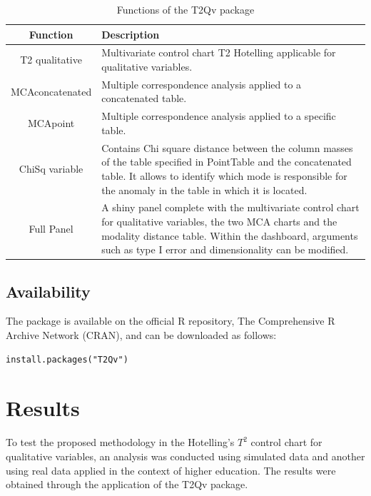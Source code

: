 \documentclass[mathematics,article,submit,moreauthors,pdftex]{mdpi}
\begin{document}
\begin{table}[h!]
\begin{center}
 \begin{tabular}{||c  m{35em}||} 
 \hline
  Function & Description \\ [0.5ex] 
 \hline\hline
 T2 qualitative & Multivariate control chart T2 Hotelling applicable for qualitative variables.\\
 \hline
  MCAconcatenated & Multiple correspondence analysis applied to a concatenated table.\\
\hline
  MCApoint & Multiple correspondence analysis applied to a specific table.\\
\hline
  ChiSq variable & Contains Chi square distance between the column masses of the table specified in PointTable and the concatenated table. It allows to identify which mode is responsible for the anomaly in the table in which it is located. \\ [1ex] 
  \hline
  Full Panel & A shiny panel complete with the 
  multivariate control chart for 
  qualitative variables, the two MCA 
  charts and the modality distance table. 
  Within the dashboard, arguments such as 
  type I error and dimensionality can be 
  modified. \\ [1ex] 
 \hline
\end{tabular}\caption{Functions of the T2Qv package}
\label{tab:functions}
\end{center}
\end{table}

\hypertarget{availability}{%
\subsection{Availability}\label{availability}}

The package is available on the official R repository, The Comprehensive
R Archive Network (CRAN), and can be downloaded as follows:

\begin{verbatim}
install.packages("T2Qv")
\end{verbatim}

\hypertarget{results}{%
\section{Results}\label{results}}

To test the proposed methodology in the Hotelling's \(T^2\) control
chart for qualitative variables, an analysis was conducted using
simulated data and another using real data applied in the context of
higher education. The results were obtained through the application of
the T2Qv package.
\end{document}
